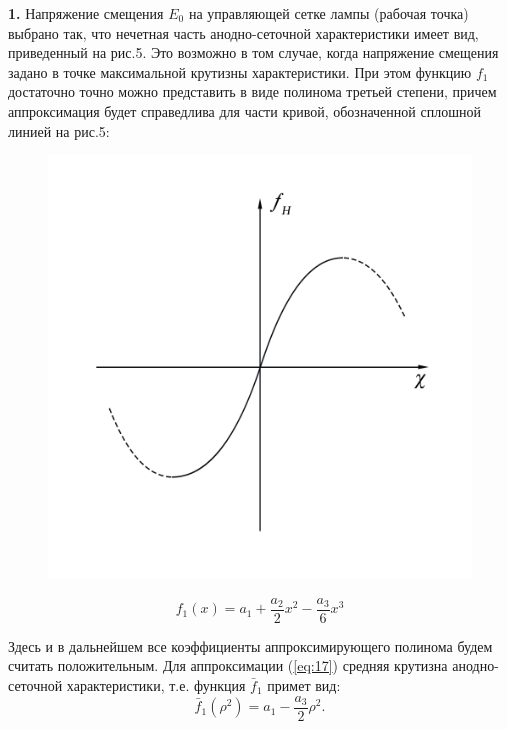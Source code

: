 {\bfseries 1.} Напряжение смещения $E_{0}$ на управляющей сетке лампы (рабочая точка) выбрано так, что нечетная часть анодно-сеточной характеристики имеет вид,  приведенный на рис.5. Это возможно в том случае, когда напряжение смещения задано в точке максимальной крутизны характеристики. При этом функцию $f_{1}$ достаточно точно можно представить в виде полинома третьей степени, причем аппроксимация будет справедлива для части кривой, обозначенной сплошной линией на рис.5:
\begin{figure}
    \begin{center}
        \includegraphics[width=\linewidth]{pics/Ris5.png} 
        \vspace{-40pt}
        \label{fig:5}
    \end{center}
\end{figure}   
\begin{equation}
\label{eq:17}
f_1(x)=a_1+\frac{a_2}{2}x^2-\frac{a_3}{6}x^3
\end{equation}

Здесь и в дальнейшем все коэффициенты аппроксимирующего полинома будем считать положительным. Для аппроксимации (\ref{eq:17}) средняя крутизна анодно-сеточной характеристики, т.е. функция $\bar{f}_1$ примет вид:
\begin{equation}
\label{eq:18}
\bar{f}_1(\rho^2)=a_1-\frac{a_3}{2}\rho^2.
\end{equation}

